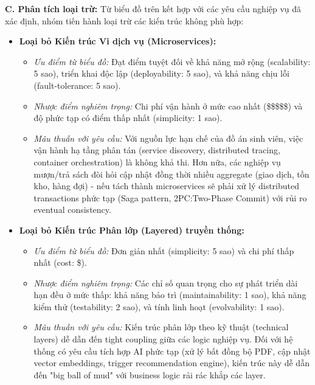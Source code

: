 \textbf{C. Phân tích loại trừ:}
Từ biểu đồ trên kết hợp với các yêu cầu nghiệp vụ đã xác định, nhóm tiến hành loại trừ các kiến trúc không phù hợp:
\begin{itemize}
    \item \textbf{Loại bỏ Kiến trúc Vi dịch vụ (Microservices):} 
    \begin{itemize}
        \item \textit{Ưu điểm từ biểu đồ:} Đạt điểm tuyệt đối về khả năng mở rộng (scalability: 5 sao), triển khai độc lập (deployability: 5 sao), và khả năng chịu lỗi (fault-tolerance: 5 sao).
        \item \textit{Nhược điểm nghiêm trọng:} Chi phí vận hành ở mức cao nhất (\$\$\$\$\$) và độ phức tạp có điểm thấp nhất (simplicity: 1 sao). 
        \item \textit{Mâu thuẫn với yêu cầu:} Với nguồn lực hạn chế của đồ án sinh viên, việc vận hành hạ tầng phân tán (service discovery, distributed tracing, container orchestration) là không khả thi. Hơn nữa, các nghiệp vụ mượn/trả sách đòi hỏi cập nhật đồng thời nhiều aggregate (giao dịch, tồn kho, hàng đợi) - nếu tách thành microservices sẽ phải xử lý distributed transactions phức tạp (Saga pattern, 2PC:Two-Phase Commit) với rủi ro eventual consistency.
    \end{itemize}
    
    \item \textbf{Loại bỏ Kiến trúc Phân lớp (Layered) truyền thống:} 
    \begin{itemize}
        \item \textit{Ưu điểm từ biểu đồ:} Đơn giản nhất (simplicity: 5 sao) và chi phí thấp nhất (cost: \$).
        \item \textit{Nhược điểm nghiêm trọng:} Các chỉ số quan trọng cho sự phát triển dài hạn đều ở mức thấp: khả năng bảo trì (maintainability: 1 sao), khả năng kiểm thử (testability: 2 sao), và tính linh hoạt (evolvability: 1 sao).
        \item \textit{Mâu thuẫn với yêu cầu:} Kiến trúc phân lớp theo kỹ thuật (technical layers) dễ dẫn đến tight coupling giữa các logic nghiệp vụ. Đối với hệ thống có yêu cầu tích hợp AI phức tạp (xử lý bất đồng bộ PDF, cập nhật vector embeddings, trigger recommendation engine), kiến trúc này dễ dẫn đến "big ball of mud" với business logic rải rác khắp các layer.
    \end{itemize}


\end{itemize}
